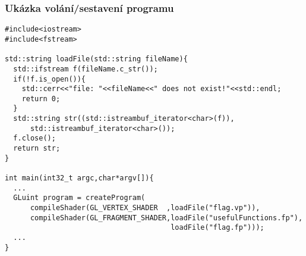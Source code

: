 \begin{frame}[fragile]
  \frametitle{Ukázka volání/sestavení programu}
    {\scriptsize
\begin{verbatim}
#include<iostream>
#include<fstream>

std::string loadFile(std::string fileName){
  std::ifstream f(fileName.c_str());
  if(!f.is_open()){
    std::cerr<<"file: "<<fileName<<" does not exist!"<<std::endl;
    return 0;
  }
  std::string str((std::istreambuf_iterator<char>(f)),
      std::istreambuf_iterator<char>());
  f.close();
  return str;
}

int main(int32_t argc,char*argv[]){
  ...
  GLuint program = createProgram(
      compileShader(GL_VERTEX_SHADER  ,loadFile("flag.vp")),
      compileShader(GL_FRAGMENT_SHADER,loadFile("usefulFunctions.fp"),
                                       loadFile("flag.fp")));
  ...
}
    \end{verbatim}
    }
\end{frame}


